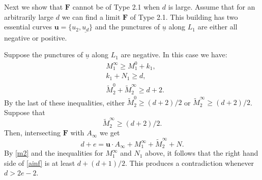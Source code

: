 \documentclass[12pt]{amsart}
\theoremstyle{definition}
\begin{document}


\bigskip


  Next we show that  $\mathbf{F}$ cannot be of Type 2.1 when $d$ is large. Assume that for an arbitrarily large $d$ we can find a limit $\mathbf{F}$ of Type 2.1. This building has two essential curves 
$\mathbf{u} = \{u_2,\underline{u_d}\}$ and the punctures of $\underline{u}$ along $L_1$ are either all negative or positive.

\bigskip

 Suppose the punctures of $\underline{u}$ along $L_1$ are negative.  In this case we have:
\begin{align*}
    &M_1^\infty \geq M_1^0 + k_1,\\
    &k_1 +N_1 \geq d,\\
    &\widetilde{M}^0_2+\widetilde{M}^\infty_2   \geq d+2.
\end{align*}
By the last of these inequalities, either $\widetilde{M}^0_2 \ge (d+2)/2$ or $\widetilde{M}^\infty_2 \ge (d+2)/2$. Suppose that  \begin{equation}\label{m2}\widetilde{M}^\infty_2 \ge (d+2)/2. \end{equation} Then, intersecting $\mathbf{F}$ with $A_\infty$ we get
\begin{equation}\label{ainf}d+e =\mathbf{u} \cdot A_\infty + M_1^{\infty} + \widetilde{M}^\infty_2 +N.\end{equation}
By \eqref{m2} and the inequalities for $M^{\infty}_1$ and $N_1$ above, it follows that the right hand side of  \eqref{ainf} is at least $d + (d+1)/2$.  This produces a contradiction whenever  $d> 2e-2$. 
\end{document}
